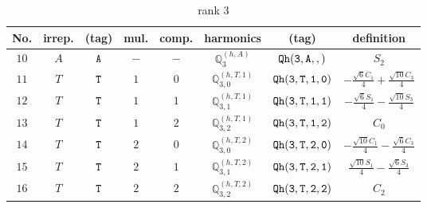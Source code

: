 \documentclass[fleqn,8pt]{jsarticle}
\begin{document}
\begin{table}[ht!]
\begin{center}
\caption{rank 3}
\renewcommand{\arraystretch}{1.3}
\begin{tabular}{cccccccc} \hline \hline
No. & irrep. & (tag) & mul. & comp. & harmonics & (tag) & definition \\ \hline
$ 10 $ & $ A $ & $ {\tt A} $ & $ - $ & $ - $ & $ \mathbb{Q}_{3}^{(h,A)} $ & $ {\tt Qh(3,A,,)} $ & $ S_{2} $ \\
$ 11 $ & $ T $ & $ {\tt T} $ & $ 1 $ & $ 0 $ & $ \mathbb{Q}_{3,0}^{(h,T,1)} $ & $ {\tt Qh(3,T,1,0)} $ & $ - \frac{\sqrt{6} C_{1}}{4} + \frac{\sqrt{10} C_{3}}{4} $ \\
$ 12 $ & $ T $ & $ {\tt T} $ & $ 1 $ & $ 1 $ & $ \mathbb{Q}_{3,1}^{(h,T,1)} $ & $ {\tt Qh(3,T,1,1)} $ & $ - \frac{\sqrt{6} S_{1}}{4} - \frac{\sqrt{10} S_{3}}{4} $ \\
$ 13 $ & $ T $ & $ {\tt T} $ & $ 1 $ & $ 2 $ & $ \mathbb{Q}_{3,2}^{(h,T,1)} $ & $ {\tt Qh(3,T,1,2)} $ & $ C_{0} $ \\
$ 14 $ & $ T $ & $ {\tt T} $ & $ 2 $ & $ 0 $ & $ \mathbb{Q}_{3,0}^{(h,T,2)} $ & $ {\tt Qh(3,T,2,0)} $ & $ - \frac{\sqrt{10} C_{1}}{4} - \frac{\sqrt{6} C_{3}}{4} $ \\
$ 15 $ & $ T $ & $ {\tt T} $ & $ 2 $ & $ 1 $ & $ \mathbb{Q}_{3,1}^{(h,T,2)} $ & $ {\tt Qh(3,T,2,1)} $ & $ \frac{\sqrt{10} S_{1}}{4} - \frac{\sqrt{6} S_{3}}{4} $ \\
$ 16 $ & $ T $ & $ {\tt T} $ & $ 2 $ & $ 2 $ & $ \mathbb{Q}_{3,2}^{(h,T,2)} $ & $ {\tt Qh(3,T,2,2)} $ & $ C_{2} $ \\
 \hline \hline
\end{tabular}
\end{center}
\end{table}
\end{document}
